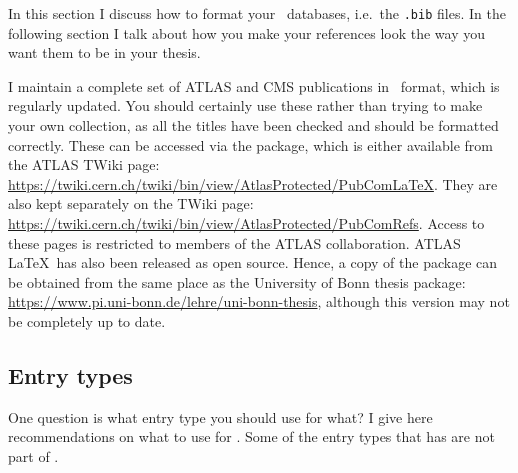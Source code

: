 In this section I discuss how to format your \BibTeX\ databases,
i.e.\ the \texttt{.bib} files. In the following section I talk about
how you make your references look the way you want them to be in your
thesis.

I maintain a complete set of ATLAS and CMS publications in \BibTeX\ format,
which is regularly updated.
You should certainly use these rather than trying to make your own collection,
as all the titles have been checked and should be formatted correctly.
These can be accessed via the  package,
which is either available from the ATLAS TWiki page:
\url{https://twiki.cern.ch/twiki/bin/view/AtlasProtected/PubComLaTeX}.
They are also kept separately on the TWiki page:
\url{https://twiki.cern.ch/twiki/bin/view/AtlasProtected/PubComRefs}.
Access to these pages is restricted to members of the ATLAS collaboration.
ATLAS \LaTeX\ has also been released as open source.
Hence, a copy of the package can be obtained from the same place as
the University of Bonn thesis package:
\url{https://www.pi.uni-bonn.de/lehre/uni-bonn-thesis},
although this version may not be completely up to date.

\subsection{Entry types}%
\label{sec:ref:entry}

One question is what entry type you should use for what? I give here
recommendations on what to use for . Some of the entry
types that  has are not part of \BibTeX.

